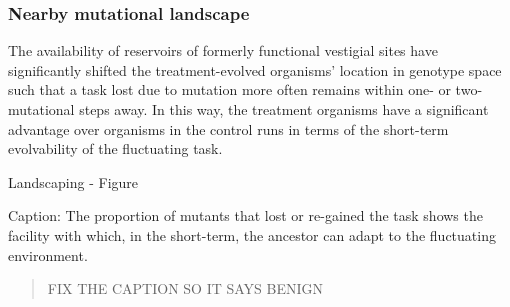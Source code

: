 \subsubsection{Nearby mutational landscape}

The availability of reservoirs of formerly functional vestigial sites have significantly shifted the treatment-evolved organisms' location in genotype space such that a task lost due to mutation more often remains within one- or two-mutational steps away. In this way, the treatment organisms have a significant advantage over organisms in the control runs in terms of the short-term evolvability of the fluctuating task.

Landscaping - Figure

Caption: The proportion of mutants that lost or re-gained the task shows the facility with which, in the short-term, the ancestor can adapt to the fluctuating environment. \begin{quote}
FIX THE CAPTION SO IT SAYS BENIGN
\end{quote}

